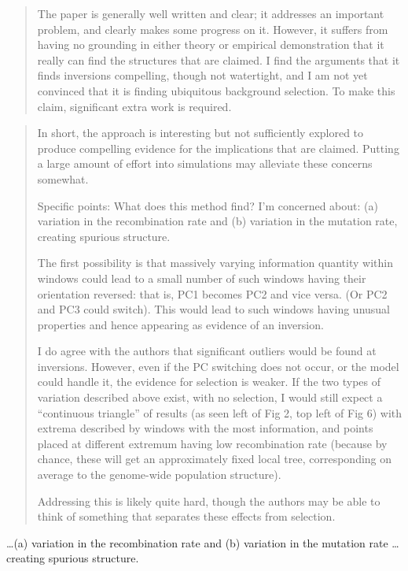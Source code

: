 \begin{quote}
    The paper is generally well written and clear; it addresses an important
    problem, and clearly makes some progress on it. However, it suffers from having
    no grounding in either theory or empirical demonstration that it really can find
    the structures that are claimed. I find the arguments that it finds inversions
    compelling, though not watertight, and I am not yet convinced that it is finding
    ubiquitous background selection.  To make this claim, significant extra work is
    required.
\end{quote}

\begin{quote}
    In short, the approach is interesting but not sufficiently explored to produce
    compelling evidence for the implications that are claimed.  Putting a large
    amount of effort into simulations may alleviate these concerns somewhat.

    Specific points: What does this method find? I'm concerned about:
    (a) variation in the recombination rate
    and (b) variation in the mutation rate, creating spurious structure.

    The first possibility is that massively varying information quantity
    within windows could lead to a small number of such windows having their
    orientation reversed: that is, PC1 becomes PC2 and vice versa. (Or PC2 and PC3
    could switch). This would lead to such windows having unusual properties and
    hence appearing as evidence of an inversion.

    I do agree with the authors that significant outliers would be found at
    inversions. However, even if the PC switching does not occur, or the model could
    handle it, the evidence for selection is weaker.  If the two types of variation
    described above exist, with no selection, I would still expect a ``continuous
    triangle'' of results (as seen left of Fig 2, top left of Fig 6) with extrema
    described by windows with the most information, and points placed at different
    extremum having low recombination rate (because by chance, these will get an
    approximately fixed local tree, corresponding on average to the genome-wide
    population structure).

    Addressing this is likely quite hard, though the authors may be able to think of
    something that separates these effects from selection.
\end{quote}


\begin{point}{}
    \ldots (a) variation in the recombination rate and 
    (b) variation in the mutation rate \ldots creating spurious structure.
\end{point}


